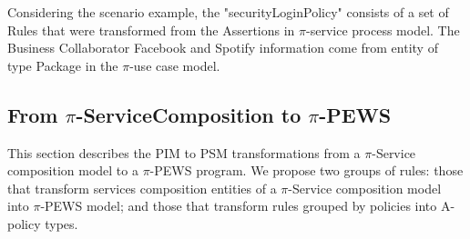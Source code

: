 






\begin{example}\label{ex:toPublicMusicT5}
Considering the scenario example, 
the "securityLoginPolicy" consists of a set of {\sf Rules} that were transformed from the {\sf Assertions} in $\pi$-service process model. 
The {\sf Business Collaborator} Facebook and Spotify information come from entity of type {\sc Package}  in the $\pi$-use case model. 
\end{example}

\subsection{From $\pi$-ServiceComposition to $\pi$-PEWS}

This section describes the PIM to PSM transformations from a $\pi$-Service composition model to a $\pi$-PEWS program. We propose two groups of rules: those that transform services composition entities of a $\pi$-Service composition model into $\pi$-PEWS model; and those that transform rules grouped by policies into A-policy types.


